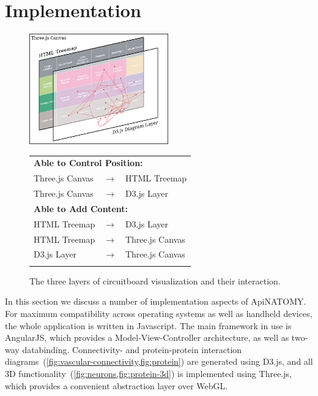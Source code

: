 \section{Implementation} \label{sect:implementation}                                     %

\begin{figure}[ht]
	\centering
	\includegraphics[width=6cm]{images/visual-layers.png}
	\hskip1mm
	\begin{tabular}[b]{lcl}
		\multicolumn{3}{l}{\textbf{Able to Control Position:}}     \\[1mm]
		Three.js Canvas     & $\longrightarrow$ & HTML Treemap     \\[1mm]
		Three.js Canvas     & $\longrightarrow$ & D3.js Layer      \\[3mm]
		
		\multicolumn{3}{l}{\textbf{Able to Add Content:}}          \\[1mm]
		HTML Treemap        & $\longrightarrow$ & D3.js Layer      \\[1mm]
		HTML Treemap        & $\longrightarrow$ & Three.js Canvas  \\[1mm]
		D3.js Layer         & $\longrightarrow$ & Three.js Canvas  \\[10mm]\phantom{x}%
	\end{tabular}
	\vskip1mm
	\caption{The three layers of circuitboard visualization and their interaction.}
	\label{fig:visual-layers}
\end{figure}

In this section we discuss a number of implementation aspects of \mbox{ApiNATOMY}.
For maximum compatibility across operating systems as well as handheld devices,
the whole application is written in Javascript. The main framework in use is
AngularJS, which provides a Model-View-Controller architecture, as well as
two-way databinding. Connectivity- and protein-protein
interaction diagrams~(\cref{fig:vascular-connectivity,fig:protein})
are generated using D3.js, and all 3D functionality~(\cref{fig:neurons,fig:protein-3d})
is implemented using Three.js, which provides a convenient abstraction layer over WebGL.



